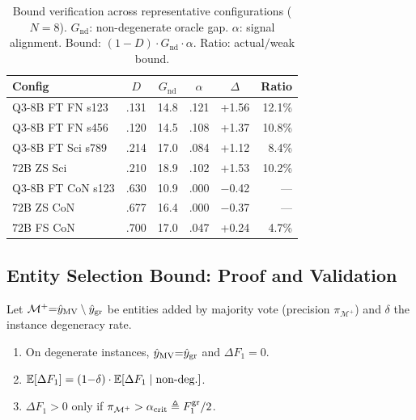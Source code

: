 \begin{table}[t]
\centering
\small
\caption{Bound verification across representative configurations ($N{=}8$). $G_{\text{nd}}$: non-degenerate oracle gap. $\alpha$: signal alignment. Bound: $(1{-}D) \cdot G_{\text{nd}} \cdot \alpha$. Ratio: actual$/$weak bound.}
\label{tab:bound_verification}
\begin{tabular}{@{}lccccr@{}}
\toprule
Config & $D$ & $G_{\text{nd}}$ & $\alpha$ & $\Delta$ & Ratio \\
\midrule
Q3-8B FT FN s123 & .131 & 14.8 & .121 & +1.56 & 12.1\% \\
Q3-8B FT FN s456 & .120 & 14.5 & .108 & +1.37 & 10.8\% \\
Q3-8B FT Sci s789 & .214 & 17.0 & .084 & +1.12 & 8.4\% \\
72B ZS Sci & .210 & 18.9 & .102 & +1.53 & 10.2\% \\
Q3-8B FT CoN s123 & .630 & 10.9 & .000 & $-$0.42 & --- \\
72B ZS CoN & .677 & 16.4 & .000 & $-$0.37 & --- \\
72B FS CoN & .700 & 17.0 & .047 & +0.24 & 4.7\% \\
\bottomrule
\end{tabular}
\end{table}

\subsection{Entity Selection Bound: Proof and Validation}\label{app:alpha_crit}

\begin{proposition}\label{prop:entity_selection_bound}
Let $\mathcal{M}^+ {=} \hat{y}_{\textup{MV}} \setminus \hat{y}_{\textup{gr}}$ be entities added by majority vote (precision $\pi_{\mathcal{M}^+}$) and $\delta$ the instance degeneracy rate.
\begin{enumerate}[label=\textup{(\alph*)},nosep,leftmargin=*]
\item On degenerate instances, $\hat{y}_{\textup{MV}} {=} \hat{y}_{\textup{gr}}$ and $\Delta F_1 {=} 0$.
\item $\mathbb{E}[\Delta F_1] = (1{-}\delta) \cdot \mathbb{E}[\Delta F_1 \mid \textup{non-deg.}]$.
\item $\Delta F_1 > 0$ only if $\pi_{\mathcal{M}^+} > \alpha_{\textup{crit}} \triangleq F_1^{\textup{gr}}/2$.
\end{enumerate}
\end{proposition}

